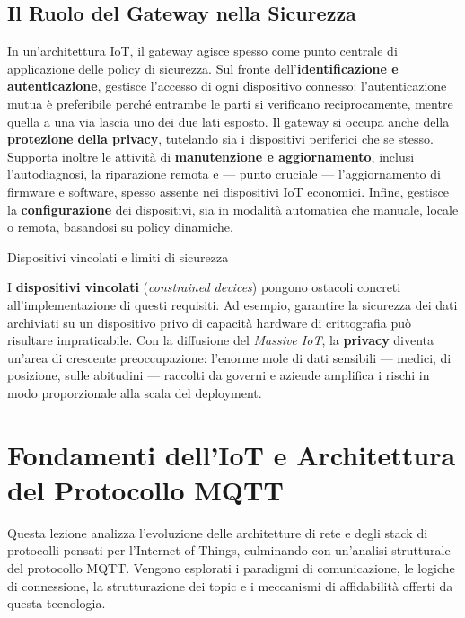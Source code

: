 \documentclass[
  italian,
  openany]{book}
\begin{document}
\section{Il Ruolo del Gateway nella
Sicurezza}\label{il-ruolo-del-gateway-nella-sicurezza}

In un'architettura IoT, il gateway agisce spesso come punto centrale di
applicazione delle policy di sicurezza. Sul fronte
dell'\textbf{identificazione e autenticazione}, gestisce l'accesso di
ogni dispositivo connesso: l'autenticazione mutua è preferibile perché
entrambe le parti si verificano reciprocamente, mentre quella a una via
lascia uno dei due lati esposto. Il gateway si occupa anche della
\textbf{protezione della privacy}, tutelando sia i dispositivi
periferici che se stesso. Supporta inoltre le attività di
\textbf{manutenzione e aggiornamento}, inclusi l'autodiagnosi, la
riparazione remota e --- punto cruciale --- l'aggiornamento di firmware
e software, spesso assente nei dispositivi IoT economici. Infine,
gestisce la \textbf{configurazione} dei dispositivi, sia in modalità
automatica che manuale, locale o remota, basandosi su policy dinamiche.

\begin{calloutwarning}{Dispositivi vincolati e limiti di sicurezza}

I \textbf{dispositivi vincolati} (\emph{constrained devices}) pongono
ostacoli concreti all'implementazione di questi requisiti. Ad esempio,
garantire la sicurezza dei dati archiviati su un dispositivo privo di
capacità hardware di crittografia può risultare impraticabile. Con la
diffusione del \emph{Massive IoT}, la \textbf{privacy} diventa un'area
di crescente preoccupazione: l'enorme mole di dati sensibili --- medici,
di posizione, sulle abitudini --- raccolti da governi e aziende
amplifica i rischi in modo proporzionale alla scala del deployment.

\end{calloutwarning}

\newpage

\chapter{Fondamenti dell'IoT e Architettura del Protocollo
MQTT}\label{fondamenti-delliot-e-architettura-del-protocollo-mqtt}

Questa lezione analizza l'evoluzione delle architetture di rete e degli
stack di protocolli pensati per l'Internet of Things, culminando con
un'analisi strutturale del protocollo MQTT. Vengono esplorati i
paradigmi di comunicazione, le logiche di connessione, la strutturazione
dei topic e i meccanismi di affidabilità offerti da questa tecnologia.
\end{document}

